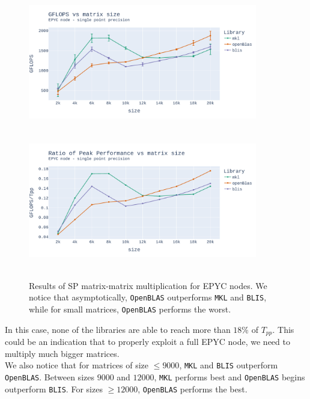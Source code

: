 \documentclass{report}
\begin{document}
\begin{figure}[H]
\hspace*{-2.5cm}
\includegraphics[width=10cm, height=6cm]{./images/fixed_cores_epyc_float_gflops.pdf}
\includegraphics[width=10cm, height=6cm]{./images/fixed_cores_epyc_float_gflops_ratio.pdf}
\caption{\label{fig:fixed_cores_epyc_float} Results of SP matrix-matrix multiplication 
for EPYC nodes. We notice that asymptotically, \texttt{OpenBLAS} outperforms 
\texttt{MKL} and \texttt{BLIS}, while for small matrices, \texttt{OpenBLAS} 
performs the worst.}
\end{figure} 

In this case, none of the libraries are able to reach more than $18\%$ of $T_{pp}$.
This could be an indication that to properly exploit a full EPYC node, we need 
to multiply much bigger matrices.
\\

We also notice that for matrices of size $\leq 9000$, \texttt{MKL} and \texttt{BLIS} 
outperform \texttt{OpenBLAS}. Between sizes $9000$ and $12000$, \texttt{MKL} 
performs best and \texttt{OpenBLAS} begins outperform \texttt{BLIS}. 
For sizes $\geq 12000$, \texttt{OpenBLAS} performs the best.
\end{document}
